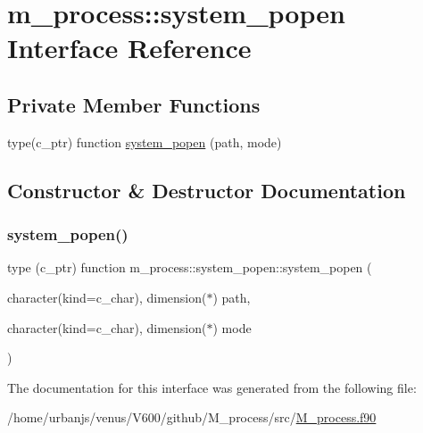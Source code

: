 \hypertarget{interfacem__process_1_1system__popen}{}\section{m\+\_\+process\+:\+:system\+\_\+popen Interface Reference}
\label{interfacem__process_1_1system__popen}
\subsection*{Private Member Functions}
\begin{DoxyCompactItemize}
\item 
type(c\+\_\+ptr) function \mbox{\hyperlink{interfacem__process_1_1system__popen_a45211cf49fdd755983b08ed6f3705bb1}{system\+\_\+popen}} (path, mode)
\end{DoxyCompactItemize}


\subsection{Constructor \& Destructor Documentation}
\mbox{\label{interfacem__process_1_1system__popen_a45211cf49fdd755983b08ed6f3705bb1}} 
\subsubsection{\texorpdfstring{system\+\_\+popen()}{system\_popen()}}
{\footnotesize\ttfamily type (c\+\_\+ptr) function m\+\_\+process\+::system\+\_\+popen\+::system\+\_\+popen (\begin{DoxyParamCaption}\item[{character(kind=c\+\_\+char), dimension($\ast$)}]{path,  }\item[{character(kind=c\+\_\+char), dimension($\ast$)}]{mode }\end{DoxyParamCaption})\hspace{0.3cm}{\ttfamily [private]}}



The documentation for this interface was generated from the following file\+:\begin{DoxyCompactItemize}
\item 
/home/urbanjs/venus/\+V600/github/\+M\+\_\+process/src/\mbox{\hyperlink{M__process_8f90}{M\+\_\+process.\+f90}}\end{DoxyCompactItemize}
